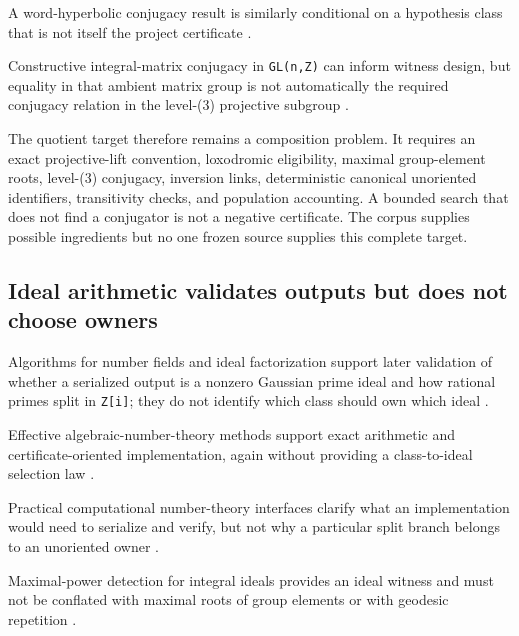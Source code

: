 \documentclass[11pt,a4paper]{article}
\begin{document}
A word-hyperbolic conjugacy result is similarly conditional on a hypothesis class that is not itself the project certificate
\citep{P29-S13}.

Constructive integral-matrix conjugacy in \texttt{GL(n,Z)} can inform witness design, but equality in that ambient matrix group is not automatically the required conjugacy relation in the level-(3) projective subgroup
\citep{P29-S14}.

The quotient target therefore remains a composition problem. It requires an exact projective-lift convention, loxodromic eligibility, maximal group-element roots, level-(3) conjugacy, inversion links, deterministic canonical unoriented identifiers, transitivity checks, and population accounting. A bounded search that does not find a conjugator is not a negative certificate. The corpus supplies possible ingredients but no one frozen source supplies this complete target.

\subsection{Ideal arithmetic validates outputs but does not choose owners}

Algorithms for number fields and ideal factorization support later validation of whether a serialized output is a nonzero Gaussian prime ideal and how rational primes split in \texttt{Z{[}i{]}}; they do not identify which class should own which ideal
\citep{P29-S19}.

Effective algebraic-number-theory methods support exact arithmetic and certificate-oriented implementation, again without providing a class-to-ideal selection law
\citep{P29-S20}.

Practical computational number-theory interfaces clarify what an implementation would need to serialize and verify, but not why a particular split branch belongs to an unoriented owner
\citep{P29-S21}.

Maximal-power detection for integral ideals provides an ideal witness and must not be conflated with maximal roots of group elements or with geodesic repetition
\citep{P29-S22}.
\end{document}

